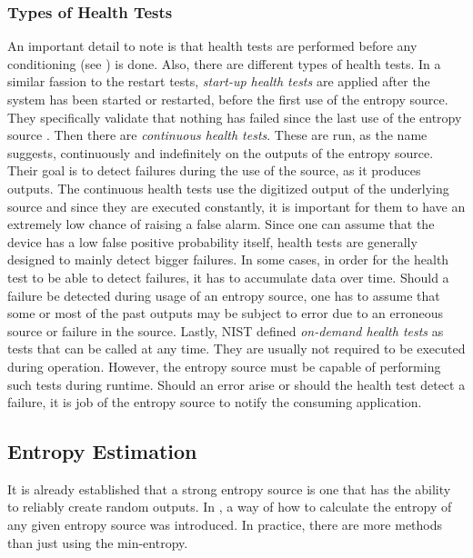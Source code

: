 \subsubsection{Types of Health Tests}
An important detail to note is that health tests are performed before any conditioning (see ) is done.
Also, there are different types of health tests. In a similar fassion to the restart tests, \emph{start-up health tests} are applied after the system has been started or restarted, before the first use of the entropy source.
They specifically validate that nothing has failed since the last use of the entropy source .
\newline
Then there are \emph{continuous health tests}. These are run, as the name suggests, continuously and indefinitely on the outputs of the entropy source. Their goal is to detect failures during the use of the source, as it produces outputs.
The continuous health tests use the digitized output of the underlying source and since they are executed constantly, it is important for them to have an extremely low chance of raising a false alarm.
Since one can assume that the device has a low false positive probability itself, health tests are generally designed to mainly detect bigger failures.
\newline
In some cases, in order for the health test to be able to detect failures, it has to accumulate data over time.
Should a failure be detected during usage of an entropy source, one has to assume that some or most of the past outputs may be subject to error due to an erroneous source or failure in the source.
\newline
Lastly, NIST defined \emph{on-demand health tests} as tests that can be called at any time.
They are usually not required to be executed during operation. However, the entropy source must be capable of performing such tests during runtime.
\emptyline
Should an error arise or should the health test detect a failure, it is job of the entropy source to notify the consuming application.

\subsection{Entropy Estimation}
It is already established that a strong entropy source is one that has the ability to reliably create random outputs.
In , a way of how to calculate the entropy of any given entropy source was introduced.
In practice, there are more methods than just using the min-entropy.

